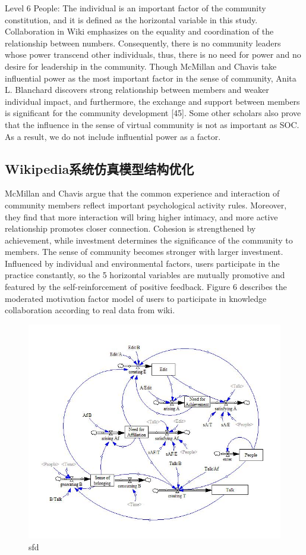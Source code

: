 \documentclass{elsarticle}
\begin{document}
Level 6 People: The individual is an important factor of the community constitution, and it is defined as the horizontal variable in this study. 
Collaboration in Wiki emphasizes on the equality and coordination of
the relationship between numbers. Consequently, there is no community
leaders whose power transcend other individuals, thus, there is no
need for power and no desire for leadership in the community. Though
McMillan and Chavis take influential power as the most important
factor in the sense of community, Anita L. Blanchard discovers strong
relationship between members and weaker individual impact, and
furthermore, the exchange and support between members is significant
for the community development [45]. Some other scholars also prove
that the influence in the sense of virtual community is not as
important as SOC. As a result, we do not include influential power as
a factor. 

\subsection{Wikipedia系统仿真模型结构优化}
\label{sec:wikipedia}

McMillan and Chavis argue that the common experience and interaction
of community members reflect important psychological activity
rules. Moreover, they find that more interaction will bring higher
intimacy, and more active relationship promotes closer
connection. Cohesion is strengthened by achievement, while investment
determines the significance of the community to members. The sense of
community becomes stronger with larger investment. Influenced by
individual and environmental factors, users participate in the
practice constantly, so the 5 horizontal variables are mutually
promotive and featured by the self-reinforcement of positive
feedback. Figure 6 describes the moderated motivation factor model of
users to participate in knowledge collaboration according to real data
from wiki.

\begin{figure}[htpb]
  \centering
  \includegraphics{06}
  \caption{sfd}
\end{figure}
\end{document}
